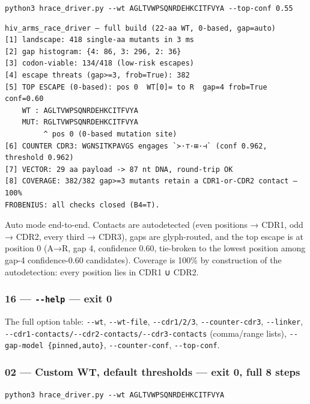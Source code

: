 \texttt{python3\ hrace\_driver.py\ -\/-wt\ AGLTVWPSQNRDEHKCITFVYA\ -\/-top-conf\ 0.55}

\begin{verbatim}
hiv_arms_race_driver — full build (22-aa WT, 0-based, gap=auto)
[1] landscape: 418 single-aa mutants in 3 ms
[2] gap histogram: {4: 86, 3: 296, 2: 36}
[3] codon-viable: 134/418 (low-risk escapes)
[4] escape threats (gap>=3, frob=True): 382
[5] TOP ESCAPE (0-based): pos 0  WT[0]= to R  gap=4 frob=True conf=0.60
    WT : AGLTVWPSQNRDEHKCITFVYA
    MUT: RGLTVWPSQNRDEHKCITFVYA
         ^ pos 0 (0-based mutation site)
[6] COUNTER CDR3: WGNSITKPAVGS engages `≻·⊤·⊞·⊣` (conf 0.962, threshold 0.962)
[7] VECTOR: 29 aa payload -> 87 nt DNA, round-trip OK
[8] COVERAGE: 382/382 gap>=3 mutants retain a CDR1-or-CDR2 contact — 100%
FROBENIUS: all checks closed (B4=T).
\end{verbatim}

Auto mode end-to-end. Contacts are autodetected (even positions → CDR1,
odd → CDR2, every third → CDR3), gaps are glyph-routed, and the top
escape is at position 0 (A→R, gap 4, confidence 0.60, tie-broken to the
lowest position among gap-4 confidence-0.60 candidates). Coverage is
100\% by construction of the autodetection: every position lies in CDR1
∪ CDR2.

\hypertarget{help-exit-0}{%
\subsubsection{\texorpdfstring{16 --- \texttt{-\/-help} --- exit
0}{16 --- -\/-help --- exit 0}}\label{help-exit-0}}

The full option table: \texttt{-\/-wt}, \texttt{-\/-wt-file},
\texttt{-\/-cdr1/2/3}, \texttt{-\/-counter-cdr3}, \texttt{-\/-linker},
\texttt{-\/-cdr1-contacts/-\/-cdr2-contacts/-\/-cdr3-contacts}
(comma/range lists), \texttt{-\/-gap-model\ \{pinned,auto\}},
\texttt{-\/-counter-conf}, \texttt{-\/-top-conf}.

\hypertarget{custom-wt-default-thresholds-exit-0-full-8-steps}{%
\subsubsection{02 --- Custom WT, default thresholds --- exit 0, full 8
steps}\label{custom-wt-default-thresholds-exit-0-full-8-steps}}

\texttt{python3\ hrace\_driver.py\ -\/-wt\ AGLTVWPSQNRDEHKCITFVYA}

